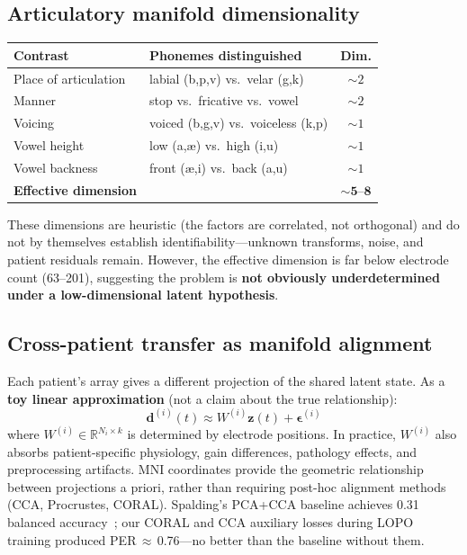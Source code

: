 \documentclass[11pt,letterpaper]{article}
\newcommand{\bfz}{\mathbf{z}}
\newcommand{\bfd}{\mathbf{d}}
\newcommand{\R}{\mathbb{R}}
\begin{document}
\subsection{Articulatory manifold dimensionality}

\begin{table}[ht!]
\centering\small
\begin{tabular}{@{}llc@{}}
\toprule
\textbf{Contrast} & \textbf{Phonemes distinguished} & \textbf{Dim.} \\
\midrule
Place of articulation & labial (b,p,v) vs.\ velar (g,k) & ${\sim}2$ \\
Manner & stop vs.\ fricative vs.\ vowel & ${\sim}2$ \\
Voicing & voiced (b,g,v) vs.\ voiceless (k,p) & ${\sim}1$ \\
Vowel height & low (a,\ae) vs.\ high (i,u) & ${\sim}1$ \\
Vowel backness & front (\ae,i) vs.\ back (a,u) & ${\sim}1$ \\
\midrule
\textbf{Effective dimension} & & $\mathbf{{\sim}5\text{--}8}$ \\
\bottomrule
\end{tabular}
\end{table}

\noindent These dimensions are heuristic (the factors are correlated, not orthogonal) and do not by themselves establish identifiability---unknown transforms, noise, and patient residuals remain.
However, the effective dimension is far below electrode count (63--201), suggesting the problem is \textbf{not obviously underdetermined under a low-dimensional latent hypothesis}.

\subsection{Cross-patient transfer as manifold alignment}

Each patient's array gives a different projection of the shared latent state. As a \textbf{toy linear approximation} (not a claim about the true relationship):
\begin{equation}
\bfd^{(i)}(t) \approx W^{(i)} \bfz(t) + \boldsymbol{\epsilon}^{(i)}
\end{equation}
where $W^{(i)} \in \R^{N_i \times k}$ is determined by electrode positions. In practice, $W^{(i)}$ also absorbs patient-specific physiology, gain differences, pathology effects, and preprocessing artifacts.
MNI coordinates provide the geometric relationship between projections a priori, rather than requiring post-hoc alignment methods (CCA, Procrustes, CORAL). Spalding's PCA+CCA baseline achieves 0.31 balanced accuracy~\cite{spalding2025}; our CORAL and CCA auxiliary losses during LOPO training produced PER\,$\approx$\,0.76---no better than the baseline without them.
\end{document}
